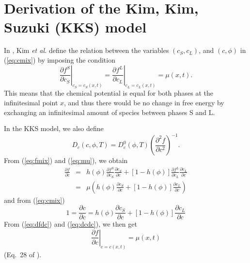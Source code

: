 %
\section{Derivation of the Kim, Kim, Suzuki (KKS) model}
\label{sec:kks}

In \cite{PhysRevE.60.7186}, Kim {\em et al.}
define the relation between the variables $(c_S,c_L)$, and
$(c,\phi)$ in (\ref{eq:cmix}) by imposing the condition
%
\begin{equation}
  \left.\frac{\partial f^S}{\partial c_S}\right|_{c_S=c_S(x,t)} =
  \left.\frac{\partial f^L}{\partial c_L}\right|_{c_L=c_L(x,t)} =
  \mu(x,t).
\label{eq:mu}
\end{equation}
%
This means that the chemical potential is equal for both phases
at the infinitesimal point $x$, and thus there would be no change
in free energy by exchanging an infinitesimal amount of species
between phases S and L.

In the KKS model, we also define
%
\begin{equation}
  D_c(c,\phi,T)=D_c^0(\phi,T)\left(\frac{\partial^2 f}{\partial
  c^2}\right)^{-1}.
\label{eq:diffcoeff}
\end{equation}
%
From (\ref{eq:fmix}) and (\ref{eq:mu}), we obtain
%
\begin{eqnarray}
  \frac{\partial f}{\partial c} &=& h(\phi)\frac{\partial
  f^S}{\partial c_S}\frac{\partial c_S}{\partial c} +
  [1-h(\phi)]\frac{\partial f^L}{\partial c_L}\frac{\partial
  c_L}{\partial c} \nonumber \\ &=&
  \mu\left(h(\phi)\frac{\partial c_S}{\partial c} +
  [1-h(\phi)]\frac{\partial c_L}{\partial c}\right)
\label{eq:dfdc} 
\end{eqnarray}
%
and from (\ref{eq:cmix})
%
\begin{equation}
  1 = \frac{\partial c}{\partial c} = h(\phi)\frac{\partial
  c_S}{\partial c} + [1-h(\phi)]\frac{\partial c_L}{\partial c}
\label{eq:dcdc}
\end{equation}
%
From (\ref{eq:dfdc}) and (\ref{eq:dcdc}), we then get
%
\begin{equation}
  \left.\frac{\partial f}{\partial c}\right|_{c=c(x,t)} = \mu(x,t)
\label{eq:dfdcmu}
\end{equation}
%
(Eq.~28 of \cite{PhysRevE.60.7186}).


